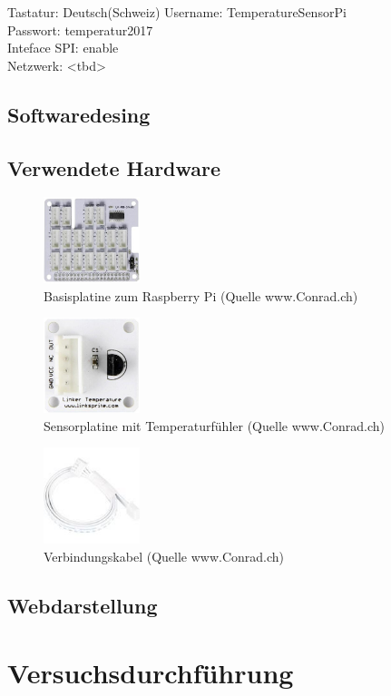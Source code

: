 Tastatur: Deutsch(Schweiz)
Username: TemperatureSensorPi\\
Passwort: temperatur2017\\
Inteface SPI: enable\\
Netzwerk: <tbd>

\subsection{Softwaredesing}
\subsection{Verwendete Hardware}

\begin{figure}[H]%
\centering
\includegraphics[width=0.25\textwidth]{Images/Basisplatine.jpg}
\caption{Basisplatine zum Raspberry Pi (Quelle www.Conrad.ch)}
\label{fig:plate}
\end{figure}

\begin{figure}[H]%
\centering
\includegraphics[width=0.25\textwidth]{Images/Sensorplatine.jpg}
\caption{Sensorplatine mit Temperaturfühler (Quelle www.Conrad.ch)}
\label{fig:sensor}
\end{figure}

\begin{figure}[H]%
\centering
\includegraphics[width=0.25\textwidth]{Images/Verbindungskabel.jpg}
\caption{Verbindungskabel (Quelle www.Conrad.ch)}
\label{fig:cable}
\end{figure}

\subsection{Webdarstellung}

\section{Versuchsdurchführung}